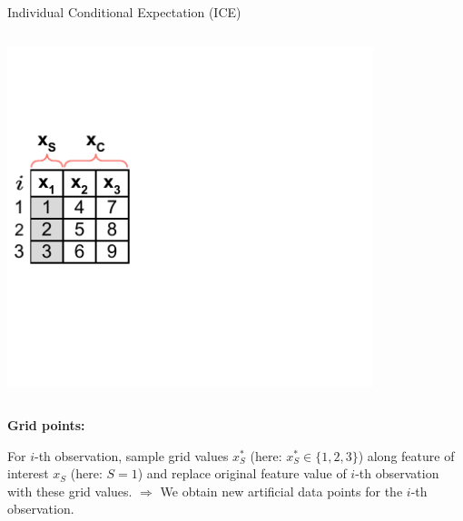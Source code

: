 \documentclass[11pt,compress,t,notes=noshow, aspectratio=169, xcolor=table]{beamer}
\begin{document}
%
%
%

\begin{frame}{Individual Conditional Expectation (ICE)}

\begin{columns}[T]
\begin{column}{0.4\textwidth}
\includegraphics[page=2, trim=0cm 0.35cm 0.85cm 0.35cm, width=0.9\textwidth]{figure_man/ice_plot_demo}
\end{column}
\begin{column}{0.55\textwidth}

\end{column}
\end{columns}

\textbf{Grid points:}

For $i$-th observation, sample grid values $x_S^*$ (here: $x_S^* \in \{1, 2, 3\}$) along feature of interest $x_S$ (here: $S = 1$) and replace original feature value of $i$-th observation with these grid values. \newline
$\Rightarrow$ We obtain new artificial data points for the $i$-th observation.

\end{frame}
\end{document}
